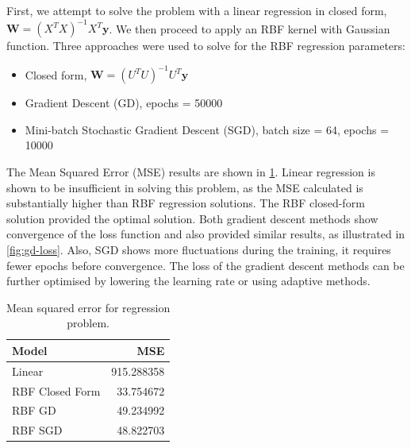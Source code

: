 \documentclass{article}
\begin{document}
First, we attempt to solve the problem with a linear regression in closed form, $\pmb{W} = (X^T X)^{-1} X^T \pmb{y}$. We then proceed to apply an RBF kernel with Gaussian function. Three approaches were used to solve for the RBF regression parameters:
\begin{itemize}
    \item Closed form, $\pmb{W} = (U^T U)^{-1} U^T \pmb{y}$
    \item Gradient Descent (GD), epochs = 50000
    \item Mini-batch Stochastic Gradient Descent (SGD), batch size = 64, epochs = 10000
\end{itemize}
The Mean Squared Error (MSE) results are shown in \cref{tab:mse-regression}. Linear regression is shown to be insufficient in solving this problem, as the MSE calculated is substantially higher than RBF regression solutions. The RBF closed-form solution provided the optimal solution. Both gradient descent methods show convergence of the loss function and also provided similar results, as illustrated in \cref{fig:gd-loss}. Also, SGD shows more fluctuations during the training, it requires fewer epochs before convergence. The loss of the gradient descent methods can be further optimised by lowering the learning rate or using adaptive methods.

\begin{table}
    \centering
    \caption{Mean squared error for regression problem.}
    \label{tab:mse-regression}
    \begin{tabular}{lr}
    \toprule
    Model &         MSE \\
    \midrule
    Linear          &  915.288358 \\
    RBF Closed Form &   33.754672 \\
    RBF GD          &   49.234992 \\
    RBF SGD         &   48.822703 \\
    \bottomrule
    \end{tabular}
\end{table}
\end{document}
